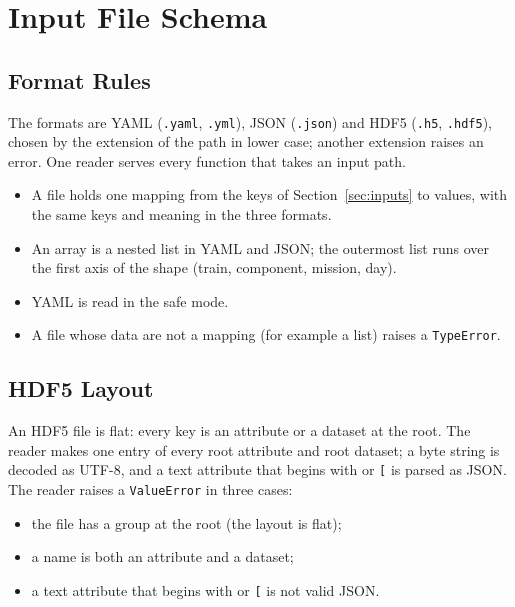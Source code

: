 
\section{Input File Schema}\label{sec:schema}

\subsection{Format Rules}

The formats are YAML (\texttt{.yaml}, \texttt{.yml}), JSON (\texttt{.json}) and HDF5 (\texttt{.h5}, \texttt{.hdf5}), chosen by the extension of the path in lower case; another extension raises an error.
One reader serves every function that takes an input path.
\begin{itemize}[leftmargin=1.5em]
  \item A file holds one mapping from the keys of Section~\ref{sec:inputs} to values, with the same keys and meaning in the three formats.
  \item An array is a nested list in YAML and JSON; the outermost list runs over the first axis of the shape (train, component, mission, day).
  \item YAML is read in the safe mode.
  \item A file whose data are not a mapping (for example a list) raises a \texttt{TypeError}.
\end{itemize}

\subsection{HDF5 Layout}\label{sec:schema_hdf5}

An HDF5 file is flat: every key is an attribute or a dataset at the root.
The reader makes one entry of every root attribute and root dataset; a byte string is decoded as UTF-8, and a text attribute that begins with \texttt{} or \texttt{[} is parsed as JSON.
The reader raises a \texttt{ValueError} in three cases:
\begin{itemize}[nosep,leftmargin=1.5em]
  \item the file has a group at the root (the layout is flat);
  \item a name is both an attribute and a dataset;
  \item a text attribute that begins with \texttt{} or \texttt{[} is not valid JSON.
\end{itemize}

